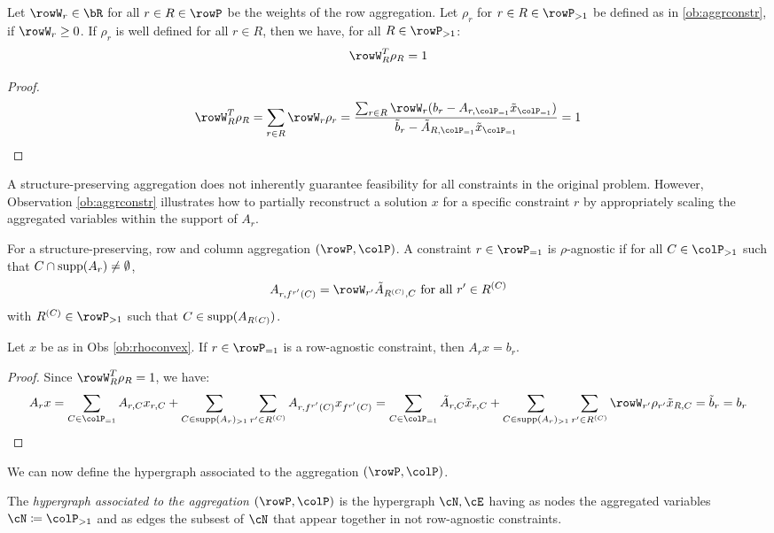 {\begin{observation}
  \label{ob:rhoconvex}
  Let \(\rowW_r \in \bR\) for all \(r \in R \in \rowP\) be the weights of the row aggregation.
  Let \(\rho_r\) for \(r \in R \in \rowP_{>1}\) be defined as in \ref{ob:aggrconstr}, if \(\rowW_r \geq 0\). If \(\rho_r\) is well defined for all \(r \in R\), then we have, for all \(R \in \rowP_{>1}\):
  \begin{equation}
    \rowW_R^T \rho_R = 1
  \end{equation}
\end{observation}
\begin{proof}
  \[
  \rowW_R^T \rho_R = \sum_{r \in R} \rowW_r \rho_r =  \frac{\sum_{r \in R}\rowW_r(b_r - A_{r, \colP_{=1}} \tilde{x}_{\colP_{=1}})}{\tilde{b}_r
  - \tilde{A}_{R, \colP_{=1}} \tilde{x}_{\colP_{=1}}} = 1
  \] 
\end{proof}

A structure-preserving aggregation does not inherently guarantee feasibility for all constraints in the original problem. However, Observation \ref{ob:aggrconstr} illustrates how to partially reconstruct a solution \(x\) for a specific constraint \(r\) by appropriately scaling the aggregated variables within the support of \(A_r\). 

\begin{definition}
  For a structure-preserving, row and column aggregation \((\rowP,\colP)\). A constraint \(r \in \rowP_{=1}\) is \(\rho\)-agnostic if for all \(C \in \colP_{>1}\) such that \(C \cap \operatorname{supp}(A_{r}) \neq \emptyset\), 
  \[A_{r,f^{r'}(C)} = \rowW_{r'}\tilde{A}_{R^{(C)},C} \text{ for all } r' \in R^{(C)} \]
   with \(R^{(C)} \in \rowP_{>1}\) such that \(C \in \operatorname{supp}(A_{R^(C)})\).
\end{definition}
\begin{observation}
 Let \(x\) be as in Obs \ref{ob:rhoconvex}. If \(r \in \rowP_{=1}\) is a row-agnostic constraint, then \(A_rx=b_r\).
\end{observation}

\begin{proof}
Since \(\rowW_R^T \rho_R = 1\), we have:
  \[
  A_rx = \sum_{C \in \colP_{=1}}A_{r,C}x_{r,C} +  \sum_{C \in \supp(A_{r})_{>1}} \sum_{r' \in R^{(C)}} A_{r,f^{r'}(C)}x_{f^{r'}(C)} = \sum_{C \in \colP_{=1}}\tilde{A}_{r,C}\tilde{x}_{r,C} +  \sum_{C \in \supp(A_{r})_{>1}} \sum_{r' \in R^{(C)}}\rowW_{r'} \rho_{r'}\tilde{x}_{R,C} = \tilde{b}_r = b_r
   \]
\end{proof}

We can now define the hypergraph associated to the aggregation \((\rowP, \colP)\).
\begin{definition}
  The \emph{hypergraph associated to the aggregation \((\rowP, \colP)\)} is the hypergraph \(\cN, \cE\) having as nodes the aggregated variables \(\cN \coloneqq \colP_{>1}\) and as edges the subsest of \(\cN\) that appear together in not row-agnostic constraints.
\end{definition}

}
